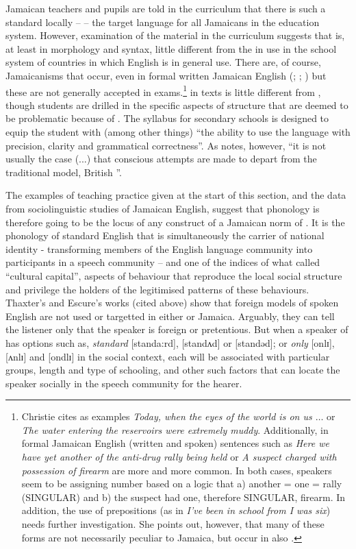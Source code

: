 Jamaican teachers and pupils are told in the curriculum that there is such a standard locally –  – the target language for all Jamaicans in the education system.  However, examination of the material in the curriculum suggests that  is, at least in morphology and syntax, little different from the  in use in the school system of countries in which English is in general use.  There are, of course, Jamaicanisms that occur, even in formal written Jamaican English (\citealt{Christie1989,Christie1998a}; \citealt{Craig1982}; \citealt{Shields-Brodber1997}) but these are not generally accepted in exams.\footnote{Christie cites as examples \textit{Today, when the eyes of the world is on us ${\ldots}$} or \textit{The water entering the reservoirs were extremely muddy}.  Additionally, in formal Jamaican English (written and spoken) sentences such as \textit{Here we have yet another of the anti-drug rally being held} or \textit{A suspect charged with possession of firearm} are more and more common. In both cases, speakers seem to be assigning number based on a logic that a) another = one = rally (SINGULAR) and b) the suspect had one, therefore SINGULAR, firearm. In addition, the use of prepositions (as in \textit{I've been in school from I was six}) needs further investigation.  She points out, however, that many of these forms are not necessarily peculiar to Jamaica, but occur in  also \citep[17--18]{Christie2003}.}    in texts is little different from , though students are drilled in the specific aspects of structure that are deemed to be problematic because of .  The syllabus for secondary schools is designed to equip the student with (among other things) “the ability to use the language with precision, clarity and grammatical correctness”.  As \citet[256]{Christie1989} notes, however, “it is not usually the case (...) that conscious attempts are made to depart from the traditional model, British ”.

The examples of teaching practice given at the start of this section, and the data from sociolinguistic studies of Jamaican English, suggest that phonology is therefore going to be the locus of any construct of a Jamaican norm of .  It is the phonology of standard English that is simultaneously the carrier of national identity - transforming members of the English language community into participants in a speech community \citep[407]{Silverstein1998} -- and one of the indices of what \citet[228]{Bourdieu1984} called ``cultural capital'', aspects of behaviour that reproduce the local social structure and privilege the holders of the legitimised patterns of these behaviours.  Thaxter’s and Escure’s works (cited above) show that foreign models of spoken English are not used or targetted in either  or Jamaica.  Arguably, they can tell the listener only that the speaker is foreign or pretentious.  But when a speaker of  has options such as, \textit{standard} [standa:rd], [standʌd] or [standǝd]; or \textit{only} [onlɪ], [ʌnlɪ] and [ondlɪ​] in the social context, each will be associated with particular groups, length and type of schooling, and other such factors that can locate the speaker socially in the speech community for the hearer.  

